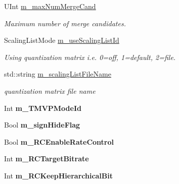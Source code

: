 \begin{DoxyCompactItemize}
\mbox{\label{class_t_enc_cfg_aabf1dca880d2c18f4bd81995943c5dc6}} 
U\+Int \hyperlink{class_t_enc_cfg_aabf1dca880d2c18f4bd81995943c5dc6}{m\+\_\+max\+Num\+Merge\+Cand}
\begin{DoxyCompactList}\small\item\em Maximum number of merge candidates. \end{DoxyCompactList}\item 
\mbox{\label{class_t_enc_cfg_a59cfb5ff97fa51902ed4166e313a5166}} 
Scaling\+List\+Mode \hyperlink{class_t_enc_cfg_a59cfb5ff97fa51902ed4166e313a5166}{m\+\_\+use\+Scaling\+List\+Id}
\begin{DoxyCompactList}\small\item\em Using quantization matrix i.\+e. 0=off, 1=default, 2=file. \end{DoxyCompactList}\item 
\mbox{\label{class_t_enc_cfg_a90382f444e6cd1525c738d11252f157b}} 
std\+::string \hyperlink{class_t_enc_cfg_a90382f444e6cd1525c738d11252f157b}{m\+\_\+scaling\+List\+File\+Name}
\begin{DoxyCompactList}\small\item\em quantization matrix file name \end{DoxyCompactList}\item 
\mbox{\label{class_t_enc_cfg_a0a75de739af5d10a6df604a803b4d441}} 
Int {\bfseries m\+\_\+\+T\+M\+V\+P\+Mode\+Id}
\item 
\mbox{\label{class_t_enc_cfg_a828fd5052c8660c53a3c5cd8fe85aec8}} 
Bool {\bfseries m\+\_\+sign\+Hide\+Flag}
\item 
\mbox{\label{class_t_enc_cfg_a3d012cd33ea73128850ecbf19b670ac0}} 
Bool {\bfseries m\+\_\+\+R\+C\+Enable\+Rate\+Control}
\item 
\mbox{\label{class_t_enc_cfg_af0a762e4eebbbb8070ab5ef16b77f161}} 
Int {\bfseries m\+\_\+\+R\+C\+Target\+Bitrate}
\item 
\mbox{\label{class_t_enc_cfg_a72fdc3d0e8efc30a4095380d7b10480a}} 
Int {\bfseries m\+\_\+\+R\+C\+Keep\+Hierarchical\+Bit}
\item 

\end{DoxyCompactItemize}

